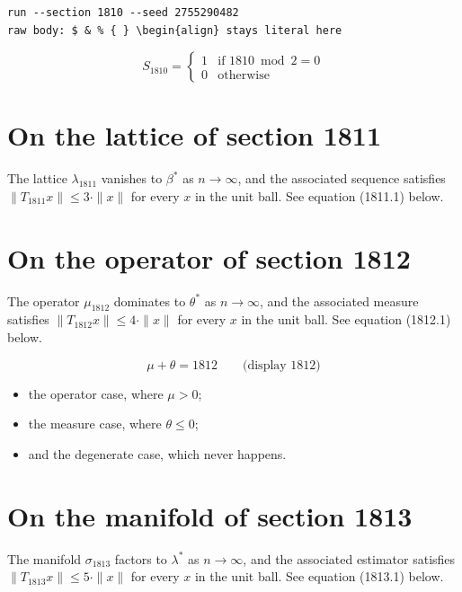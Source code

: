 \documentclass{article}
\begin{document}
\begin{verbatim}
run --section 1810 --seed 2755290482
raw body: $ & % { } \begin{align} stays literal here
\end{verbatim}

\begin{equation}
S_{1810} = \begin{cases} 1 & \text{if } 1810 \bmod 2 = 0 \\ 0 & \text{otherwise} \end{cases}
\end{equation}

\section{On the lattice of section 1811}
The lattice $\lambda_{1811}$ vanishes to $\beta^{*}$ as $n \to \infty$,
and the associated sequence satisfies $\|T_{1811} x\| \leq 3 \cdot \|x\|$
for every $x$ in the unit ball. See equation (1811.1) below.

\section{On the operator of section 1812}
The operator $\mu_{1812}$ dominates to $\theta^{*}$ as $n \to \infty$,
and the associated measure satisfies $\|T_{1812} x\| \leq 4 \cdot \|x\|$
for every $x$ in the unit ball. See equation (1812.1) below.

$$
\mu + \theta = 1812 \qquad \text{(display 1812)}
$$

\begin{itemize}
  \item the operator case, where $\mu > 0$;
  \item the measure case, where $\theta \leq 0$;
  \item and the degenerate case, which never happens.
\end{itemize}

\section{On the manifold of section 1813}
The manifold $\sigma_{1813}$ factors to $\lambda^{*}$ as $n \to \infty$,
and the associated estimator satisfies $\|T_{1813} x\| \leq 5 \cdot \|x\|$
for every $x$ in the unit ball. See equation (1813.1) below.
\end{document}
